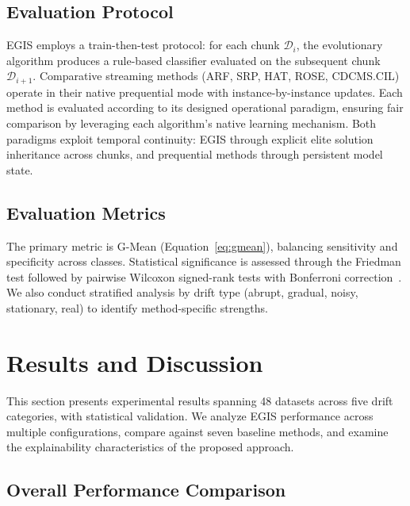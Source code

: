 \documentclass[lettersize,journal]{IEEEtran}
\begin{document}
\subsection{Evaluation Protocol}

EGIS employs a train-then-test protocol: for each chunk $\mathcal{D}_i$, the evolutionary algorithm produces a rule-based classifier evaluated on the subsequent chunk $\mathcal{D}_{i+1}$. Comparative streaming methods (ARF, SRP, HAT, ROSE, CDCMS.CIL) operate in their native prequential mode with instance-by-instance updates. Each method is evaluated according to its designed operational paradigm, ensuring fair comparison by leveraging each algorithm's native learning mechanism. Both paradigms exploit temporal continuity: EGIS through explicit elite solution inheritance across chunks, and prequential methods through persistent model state.

\subsection{Evaluation Metrics}

The primary metric is G-Mean (Equation~\ref{eq:gmean}), balancing sensitivity and specificity across classes. Statistical significance is assessed through the Friedman test followed by pairwise Wilcoxon signed-rank tests with Bonferroni correction~\cite{demsar2006statistical}. We also conduct stratified analysis by drift type (abrupt, gradual, noisy, stationary, real) to identify method-specific strengths.


\section{Results and Discussion}
\label{sec:results}

This section presents experimental results spanning 48 datasets across five drift categories, with statistical validation. We analyze EGIS performance across multiple configurations, compare against seven baseline methods, and examine the explainability characteristics of the proposed approach.

\subsection{Overall Performance Comparison}
\end{document}
